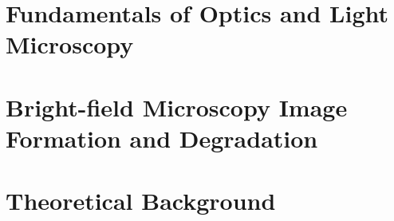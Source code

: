 \documentclass[mestrado, qualificacao]{packages/icmc}
\begin{document}
\textual

% 

\chapter{Fundamentals of Optics and Light Microscopy}
\label{chapter:fundamentals-of-optics-and-light-microscopy}


\chapter{Bright-field Microscopy Image Formation and Degradation}
\label{chapter:blur-characterization-and-image-formation}


\chapter{Theoretical Background}
\label{chapter:theoretical-background}


% 

% 

% 

% 
\end{document}
